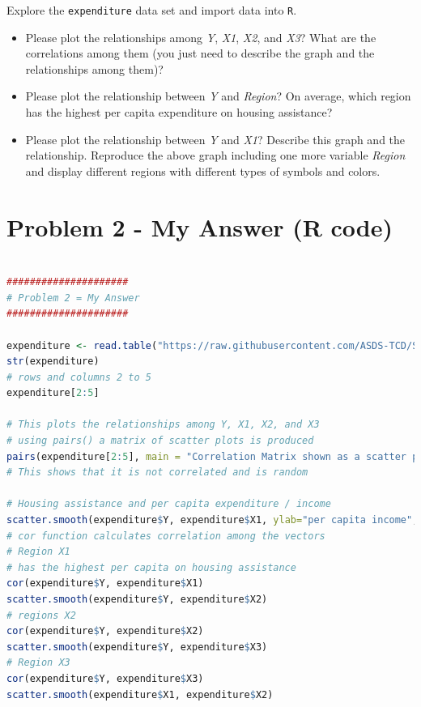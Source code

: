 \documentclass[12pt,letterpaper]{article}
\begin{document}
\vspace{.5cm}
\noindent Explore the \texttt{expenditure} data set and import data into \texttt{R}.
\vspace{.5cm}
  
\vspace{.5cm}
\begin{itemize}

\item
Please plot the relationships among \emph{Y}, \emph{X1}, \emph{X2}, and \emph{X3}? What are the correlations among them (you just need to describe the graph and the relationships among them)?
\vspace{.5cm}
\item
Please plot the relationship between \emph{Y} and \emph{Region}? On average, which region has the highest per capita expenditure on housing assistance?
\vspace{.5cm}
\item
Please plot the relationship between \emph{Y} and \emph{X1}? Describe this graph and the relationship. Reproduce the above graph including one more variable \emph{Region} and display different regions with different types of symbols and colors.
\end{itemize}

\newpage

\section*{Problem 2 - My Answer (R code)}
	


\begin{lstlisting}[language=R]

#####################
# Problem 2 = My Answer
#####################

expenditure <- read.table("https://raw.githubusercontent.com/ASDS-TCD/StatsI_Fall2021/main/datasets/expenditure.txt", header=T)
str(expenditure)
# rows and columns 2 to 5
expenditure[2:5]

# This plots the relationships among Y, X1, X2, and X3
# using pairs() a matrix of scatter plots is produced
pairs(expenditure[2:5], main = "Correlation Matrix shown as a scatter plot")
# This shows that it is not correlated and is random

# Housing assistance and per capita expenditure / income
scatter.smooth(expenditure$Y, expenditure$X1, ylab="per capita income", xlab = "housing assistance")
# cor function calculates correlation among the vectors
# Region X1
# has the highest per capita on housing assistance
cor(expenditure$Y, expenditure$X1)
scatter.smooth(expenditure$Y, expenditure$X2)
# regions X2
cor(expenditure$Y, expenditure$X2)
scatter.smooth(expenditure$Y, expenditure$X3)
# Region X3
cor(expenditure$Y, expenditure$X3)
scatter.smooth(expenditure$X1, expenditure$X2)


\end{lstlisting}
\end{document}
